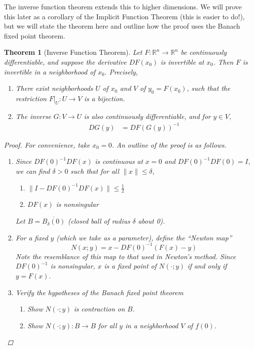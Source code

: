 \documentclass[12pt]{amsart}         %
\newtheorem{theorem}{Theorem}[section]
\theoremstyle{remark}
\newcommand{\R}{\mathbb{R}}
\begin{document}
The inverse function theorem extends this to higher dimensions. We will prove this later as a corollary of the Implicit Function Theorem (this is easier to do!), but we will state the theorem here and outline how the proof uses the Banach fixed point theorem.

\begin{theorem}[Inverse Function Theorem]
Let $F: \R^n \rightarrow \R^n$ be continuously differentiable, and suppose the derivative $DF(x_0)$ is invertible at $x_0$. Then $F$ is invertible in a neighborhood of $x_0$. Precisely,

\begin{enumerate}
\item There exist neighborhoods $U$ of $x_0$ and $V$ of $y_0 = F(x_0)$, such that the restriction $F|_U: U \rightarrow V$ is a bijection.
\item The inverse $G: V \rightarrow U$ is also continuously differentiable, and for $y \in V$,
\begin{align}
DG(y) &= DF(G(y))^{-1}
\end{align}
\end{enumerate}
\begin{proof}
For convenience, take $x_0 = 0$. An outline of the proof is as follows.
\begin{enumerate}
    \item Since $DF(0)^{-1} DF(x)$ is continuous at $x = 0$ and $DF(0)^{-1} DF(0) = I$, we can find $\delta > 0$ such that for all $\|x\| \leq \delta$,
    \begin{enumerate}
    \item $\|I - DF(0)^{-1} DF(x)\| \leq \frac{1}{2}$
    \item $DF(x)$ is nonsingular
    \end{enumerate}
    Let $B = \overline{ B_\delta(0) }$ (closed ball of radius $\delta$ about 0).

    \item For a fixed $y$ (which we take as a parameter), define the ``Newton map'' 
    \begin{equation*}
    N(x; y) = x - DF(0)^{-1}(F(x) - y)
    \end{equation*}
    Note the resemblance of this map to that used in Newton's method. Since $DF(0)^{-1}$ is nonsingular, $x$ is a fixed point of $N(\cdot; y)$ if and only if $y = F(x)$.

    \item Verify the hypotheses of the Banach fixed point theorem
    \begin{enumerate}
    \item Show $N(\cdot; y)$ is contraction on $B$.
    \item Show $N(\cdot; y): B \rightarrow B$ for all $y$ in a neighborhood $V$ of $f(0)$.
    \end{enumerate}
    

\end{enumerate}
\end{proof}
\end{theorem}
\end{document}
